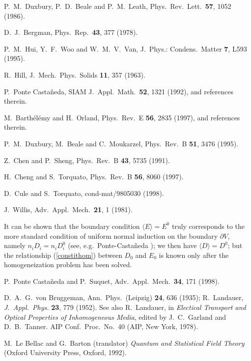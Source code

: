 \begin{thebibliography}{99}
 P.\ M.\ Duxbury, P.\ D.\ Beale and P.\ M.\ Leath, 
Phys.\ Rev.\ Lett.\ {\bf 57}, 1052 (1986).

 D.\ J.\ Bergman, Phys.\ Rep.\ {\bf 43}, 377 (1978).

 P.\ M.\ Hui, Y.\ F.\ Woo and W.\ M.\ V.\ Van, 
J.\ Phys.: Condens.\ Matter {\bf 7}, L593  (1995).

 R.\ Hill, 
J.\ Mech.\ Phys.\ Solids {\bf 11}, 357 (1963).

  P.\ Ponte Casta\~neda, 
SIAM J.\ Appl.\ Math.\ {\bf 52}, 1321 (1992), and references therein.

 M.\ Barth\'el\'emy and H.\ Orland, 
Phys.\ Rev.\ E {\bf 56}, 2835 (1997), and references therein.

 P.\ M.\ Duxbury, M.\ Beale and C.\ Moukarzel, 
Phys.\ Rev.\ B {\bf 51}, 3476 (1995).

 Z.\ Chen and P.\ Sheng, 
Phys.\ Rev.\ B {\bf 43}, 5735 (1991). 

 H.\ Cheng and S.\ Torquato, 
Phys.\ Rev.\ B {\bf 56}, 8060 (1997).

 D.\ Cule and S.\ Torquato, cond-mat/9805030 (1998).

 J.\ Willis, Adv.\ Appl.\ Mech.\ {\bf 21}, 1 (1981).

 It can be shown that the boundary condition 
$\langle{E}\rangle=E^0$ truly corresponds to the more 
standard condition of uniform normal induction on the 
boundary $\partial V$, namely $n_i D_i=n_i D^0_i$ 
(see, e.g.\ Ponte-Casta\~neda \cite{PONT92b}); we then 
have $\langle{D}\rangle=D^0$; but the relationship 
(\ref{constithom}) between $D_0$ and $E_0$ is known 
only after the homogeneization problem has been solved.

 P.\ Ponte Casta\~neda and P.\ Suquet, 
Adv.\ Appl.\ Mech.\ {\bf 34}, 171 (1998).

 D.\ A.\ G.\ von Bruggeman, 
Ann.\ Phys.\ (Leipzig) {\bf 24}, 636 (1935); 
R.~Landauer, {\it J.~Appl.~Phys.} {\bf 23}, 779 (1952). 
See also R.~Landauer, in {\it Electical Transport and 
Optical Properties of 
Inhomogeneous Media}, edited by J.~C.~Garland and D.~B.~Tanner. 
AIP Conf.~Proc.~No.\ 40 (AIP, New York, 1978).

 M.\ Le Bellac and G.\ Barton (translator) 
{\em Quantum and Statistical Field Theory} 
(Oxford University Press, Oxford, 1992). 


\end{thebibliography}
